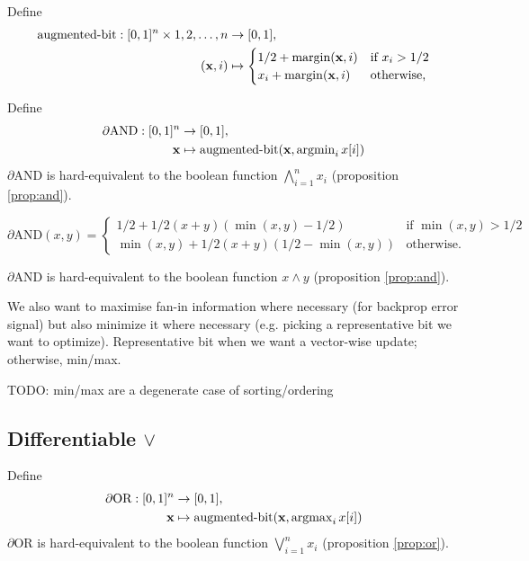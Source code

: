 \documentclass{article} %
\begin{document}
Define 
\begin{equation*}
\begin{aligned}
\operatorname{augmented-bit}: [0,1]^{n} \times 1,2,\dots,n &\to [0,1],\\
({\bf x}, i) &\mapsto 
\begin{cases}
1/2 + \operatorname{margin}({\bf x}, i) & \text{if } x_{i} > 1/2 \\
x_{i} + \operatorname{margin}({\bf x}, i) & \text{otherwise,}
\end{cases}
\end{aligned}
\end{equation*}


Define
\begin{equation*}
\begin{aligned}
\partial\text{AND}: [0,1]^{n} &\to [0,1], \\
{\bf x} &\mapsto \operatorname{augmented-bit}({\bf x}, \operatorname{argmin}\limits_{i} x[i])
\end{aligned}
\end{equation*}
$\partial${AND} is hard-equivalent to the boolean function $\bigwedge_{i=1}^{n} x_i$ (proposition \ref{prop:and}).

\begin{equation*}
\partial\text{AND}(x, y) =
	\begin{cases}
	1/2 + 1/2(x + y)(\operatorname{min}(x,y) - 1/2) & \text{if } \operatorname{min}(x,y) > 1/2 \\
	\operatorname{min}(x,y) + 1/2(x + y)(1/2 - \operatorname{min}(x,y)) & \text{otherwise.}
	\end{cases}
\end{equation*}

$\partial${AND} is hard-equivalent to the boolean function $x \wedge y$ (proposition \ref{prop:and}).


We also want to maximise fan-in information where necessary (for backprop error signal) but also minimize it where necessary (e.g. picking a representative bit we want to optimize). Representative bit when we want a vector-wise update; otherwise, min/max.

TODO: min/max are a degenerate case of sorting/ordering

\subsection{Differentiable $\vee$}

Define
\begin{equation*}
\begin{aligned}
\partial\text{OR}: [0,1]^{n} &\to [0,1], \\
{\bf x} &\mapsto \operatorname{augmented-bit}({\bf x}, \operatorname{argmax}\limits_{i} x[i])
\end{aligned}
\end{equation*}
$\partial${OR} is hard-equivalent to the boolean function $\bigvee_{i=1}^{n} x_i$ (proposition \ref{prop:or}).
\end{document}
